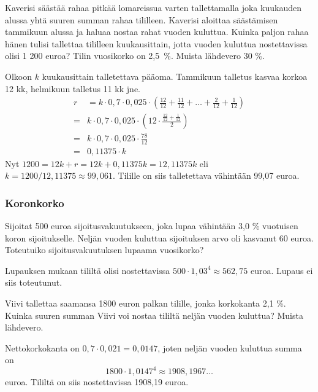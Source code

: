 \documentclass[a4paper,10pt]{article}\usepackage[]{graphicx}\usepackage[]{color}
\begin{document}
\begin{question} Kaverisi säästää rahaa pitkää lomareissua varten tallettamalla joka kuukauden alussa yhtä suuren summan rahaa tililleen.
Kaverisi aloittaa säästämisen tammikuun alussa ja haluaa nostaa rahat vuoden kuluttua.
Kuinka paljon rahaa hänen tulisi tallettaa tililleen kuukausittain, jotta vuoden kuluttua nostettavissa olisi 1 200 euroa?
Tilin vuosikorko on 2{,}5~\%. Muista lähdevero 30 \%.
\end{question}\begin{solution}
    Olkoon \(k\) kuukausittain talletettava pääoma. Tammikuun talletus kasvaa korkoa 12 kk, helmikuun talletus 11 kk jne.
    \begin{align*}
        r &= k\cdot0,7\cdot0,025\cdot\left(\frac{12}{12} + \frac{11}{12} + \ldots + \frac{2}{12} + \frac{1}{12}\right)\\
         =& k\cdot0,7\cdot0,025\cdot\left(12\cdot\frac{\frac{12}{12} + \frac{1}{12}}{2}\right)\\
         =& k\cdot0,7\cdot0,025\cdot\frac{78}{12}\\
         =& 0,11375\cdot k
    \end{align*}
    Nyt \(1200 = 12k + r = 12k + 0,11375k = 12,11375k\) eli \(k = 1200/12,11375\approx 99,061\).
    Tilille on siis talletettava vähintään 99,07 euroa.
\end{solution}

\subsubsection*{Koronkorko}

\begin{question} Sijoitat 500 euroa sijoitusvakuutukseen, joka lupaa vähintään 3{,}0 \% vuotuisen koron sijoitukselle.
Neljän vuoden kuluttua sijoituksen arvo oli kasvanut 60 euroa. Toteutuiko sijoitusvakuutuksen lupaama vuosikorko?
\end{question}\begin{solution}
    Lupauksen mukaan tililtä olisi nostettavissa \(500\cdot1,03^4\approx562,75\) euroa. Lupaus ei siis toteutunut.
\end{solution}

\begin{question} Viivi tallettaa saamansa 1800 euron palkan tilille, jonka korkokanta 2,1 \%. Kuinka suuren summan Viivi voi nostaa tililtä
neljän vuoden kuluttua? Muista lähdevero.
\end{question}\begin{solution}
    Nettokorkokanta on \(0,7\cdot0,021 = 0,0147\),
    joten neljän vuoden kuluttua summa on
    \[
        1800\cdot1,0147^4\approx1908,1967\dots
    \]
    euroa. Tililtä on siis nostettavissa 1908,19 euroa.
\end{solution}
\end{document}
